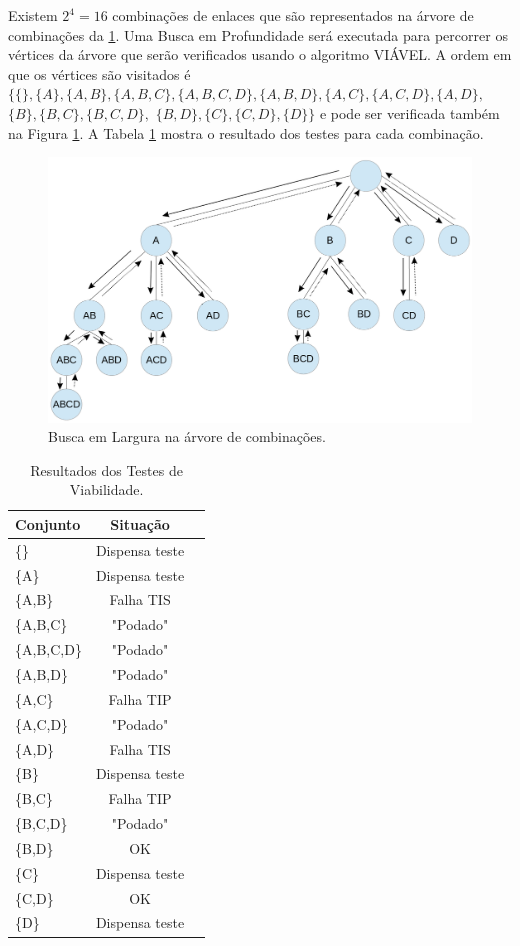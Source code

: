 Existem $2^4 = 16$ combinações de enlaces que são representados na árvore de combinações da \ref{fig:bp}. Uma Busca em Profundidade será executada para percorrer os vértices da árvore que serão verificados usando o algoritmo VIÁVEL. A ordem em que os vértices são visitados é $\{\{\}, \{A\}, \{A,B\}, \{A,B,C\}, \{A,B,C,D\}, \{A,B,D\}, \{A,C\}, \{A,C,D\}, \{A,D\},$ $\{B\}, \{B,C\}, \{B,C,D\},$ $\{B,D\}, \{C\}, \{C,D\}, \{D\}\}$ e pode ser verificada também na Figura \ref{fig:bp}. A Tabela \ref{table:resultadoviabilidade} mostra o resultado dos testes para cada combinação. 

\begin{figure}[htb]
\centering
\includegraphics[width=1\textwidth]{figs/bp}
\caption[Busca em Largura na árvore de combinações.]
{Busca em Largura na árvore de combinações.}
\label{fig:bp}
\end{figure}

\begin{table}[h]
\centering
\caption[Resultados dos Testes de Viabilidade.]
{Resultados dos Testes de Viabilidade.}
\label{table:resultadoviabilidade}
\begin{tabular}{lcc}
\hline
Conjunto & Situação\\ \hline
\{\} & Dispensa teste\\
\{A\}	& Dispensa teste\\
\{A,B\}	& Falha TIS\\
\{A,B,C\}	& "Podado"\\
\{A,B,C,D\}	& "Podado"\\
\{A,B,D\}	& "Podado"\\
\{A,C\}	& Falha TIP\\
\{A,C,D\}	& "Podado"\\
\{A,D\}	& Falha TIS\\
\{B\}	& Dispensa teste\\
\{B,C\}	& Falha TIP\\
\{B,C,D\}	& "Podado"\\
\{B,D\}	& OK\\
\{C\}	& Dispensa teste\\
\{C,D\}	& OK\\
\{D\}	& Dispensa teste\\
\end{tabular}
\end{table}

